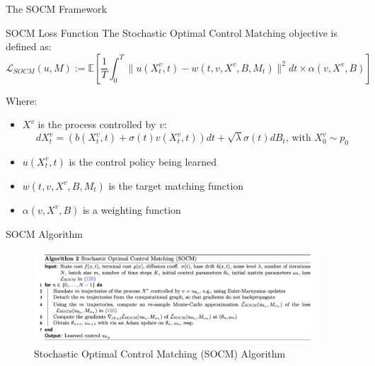 \documentclass[aspectratio=169,xcolor=dvipsnames]{beamer}
\begin{document}
\begin{frame}{The SOCM Framework}
    \small
    \begin{block}{SOCM Loss Function}
        The Stochastic Optimal Control Matching objective is defined as:
        \begin{equation}
        \mathcal{L}_{SOCM}(u, M) := \mathbb{E}\left[\frac{1}{T}\int_0^T \|u(X^v_t, t) - w(t, v, X^v, B, M_t)\|^2 dt \times \alpha(v, X^v, B)\right]
        \end{equation}
    \end{block}

    \begin{block}{Where:}
        \begin{itemize}
            \item $X^v$ is the process controlled by $v$: 
            \begin{equation}
            dX^v_t = (b(X^v_t, t) + \sigma(t)v(X^v_t, t)) dt + \sqrt{\lambda}\sigma(t) dB_t \text{, with } X^v_0 \sim p_0
            \end{equation} 
            \item $u(X^v_t, t)$ is the control policy being learned
            \item $w(t, v, X^v, B, M_t)$ is the target matching function
            \item $\alpha(v, X^v, B)$ is a weighting function
        \end{itemize}
    \end{block}
\end{frame}

\begin{frame}{SOCM Algorithm}
    \begin{figure}
        \centering
        \includegraphics[width=0.95\textwidth]{figures/SOCM_algo.png}
        \caption{Stochastic Optimal Control Matching (SOCM) Algorithm}
    \end{figure}
\end{frame}
\end{document}
